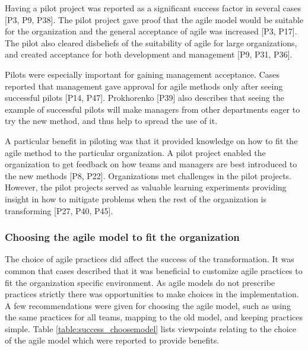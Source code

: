 
Having a pilot project was reported as a significant success factor in several
cases [P3, P9, P38].
The pilot project gave proof that the agile model would be suitable for the
organization and the general acceptance of agile was increased [P3, P17].
The pilot also cleared disbeliefs of the suitability of agile for large
organizations, and created acceptance for both development and management [P9,
P31, P36].

Pilots were especially important for gaining management acceptance. Cases
reported that management gave approval for agile methods only after seeing
successful pilots [P14, P47]. Prokhorenko [P39] also describes that seeing the
example of successful pilots will make managers from other departments eager to
try the new method, and thus help to spread the use of it.


A particular benefit in piloting was that it provided knowledge on how to fit
the agile method to the particular organization.
A pilot project enabled the organization to get feedback on how teams and
managers are best introduced to the new methods [P8, P22].
Organizations met challenges in the pilot projects. However, the pilot projects
served as valuable learning experiments providing insight in how to mitigate
problems when the rest of the organization is transforming [P27, P40, P45].


\subsubsection{Choosing the agile model to fit the organization}

The choice of agile practices did affect the success of the transformation. It
was common that cases described that it was beneficial to customize agile
practices to fit the organization specific environment. As agile models do not
prescribe practices strictly there was opportunities to make choices in the
implementation. A few recommendations were given for choosing the agile model,
such as using the same practices for all teams, mapping to the old model, and
keeping practices simple. Table \ref{table:success_choosemodel} lists viewpoints
relating to the choice of the agile model which were reported to provide
benefits.

